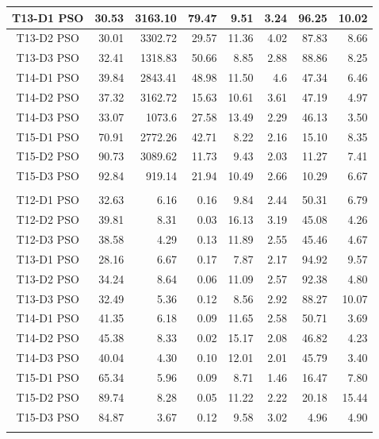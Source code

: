 \documentclass[a4paper,slovak,12pt,appendix]{article}
\begin{document}
\begin{appendices}
\begin{table}[!ht]
\begin{tabular}{|c|r|r|r|r|r|r|r|}
		T13-D1 PSO			&	30.53	&	3163.10	&	79.47	&	9.51	&	3.24	&	96.25	&	10.02	\\ \hline
		T13-D2 PSO			&	30.01	&	3302.72	&	29.57	&	11.36	&	4.02	&	87.83	&	8.66	\\ \hline
		T13-D3 PSO			&	32.41	&	1318.83	&	50.66	&	8.85	&	2.88	&	88.86	&	8.25	\\ \hline

		T14-D1 PSO		&	39.84	&	2843.41	&	48.98	&	11.50	&	4.6		&	47.34	&	6.46	\\ \hline
		T14-D2 PSO		&	37.32	&	3162.72	&	15.63	&	10.61	&	3.61	&	47.19	&	4.97	\\ \hline
		T14-D3 PSO		&	33.07	&	1073.6	&	27.58	&	13.49	&	2.29	&	46.13	&	3.50	\\ \hline

		T15-D1 PSO		&	70.91	&	2772.26	&	42.71	&	8.22	&	2.16	&	15.10	&	8.35	\\ \hline
		T15-D2 PSO		&	90.73	&	3089.62	&	11.73	&	9.43	&	2.03	&	11.27	&	7.41	\\ \hline
		T15-D3 PSO		&	92.84	&	919.14	&	21.94	&	10.49	&	2.66	&	10.29	&	6.67	\\ \hline
		\multicolumn{8}{|c|}{}	\\ \hline

		T12-D1 PSO			&	32.63	&	6.16	&	0.16	&	9.84	&	2.44	&	50.31	&	6.79	\\ \hline
		T12-D2 PSO			&	39.81	&	8.31	&	0.03	&	16.13	&	3.19	&	45.08	&	4.26	\\ \hline
		T12-D3 PSO			&	38.58	&	4.29	&	0.13	&	11.89	&	2.55	&	45.46	&	4.67	\\ \hline

		T13-D1 PSO		&	28.16	&	6.67	&	0.17	&	7.87	&	2.17	&	94.92	&	9.57	\\ \hline
		T13-D2 PSO		&	34.24	&	8.64	&	0.06	&	11.09	&	2.57	&	92.38	&	4.80	\\ \hline
		T13-D3 PSO		&	32.49	&	5.36	&	0.12	&	8.56	&	2.92	&	88.27	&	10.07	\\ \hline

		T14-D1 PSO		&	41.35	&	6.18	&	0.09	&	11.65	&	2.58	&	50.71	&	3.69	\\ \hline
		T14-D2 PSO		&	45.38	&	8.33	&	0.02	&	15.17	&	2.08	&	46.82	&	4.23	\\ \hline
		T14-D3 PSO		&	40.04	&	4.30	&	0.10	&	12.01	&	2.01	&	45.79	&	3.40	\\ \hline

		T15-D1 PSO		&	65.34	&	5.96	&	0.09	&	8.71	&	1.46	&	16.47	&	7.80	\\ \hline
		T15-D2 PSO		&	89.74	&	8.28	&	0.05	&	11.22	&	2.22	&	20.18	&	15.44	\\ \hline
		T15-D3 PSO		&	84.87	&	3.67	&	0.12	&	9.58	&	3.02	&	4.96	&	4.90	\\ \hline
		\multicolumn{8}{|c|}{}	\\ \hline


\end{tabular}
\end{table}
\end{appendices}
\end{document}
